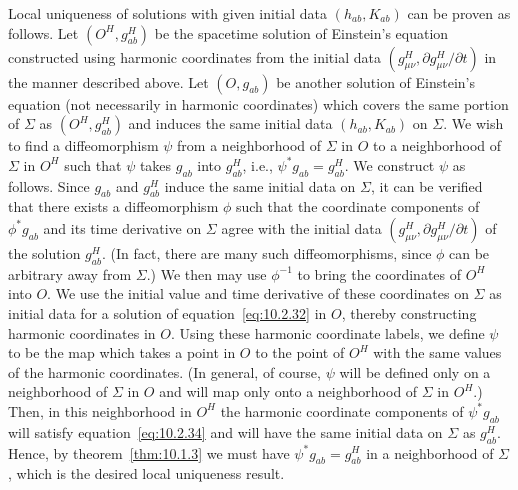 Local uniqueness of solutions with given initial data \((h_{ab},K_{ab})\) can be
proven as follows. Let \((O^H,g^H_{ab})\) be the spacetime solution of Einstein's
equation constructed using harmonic coordinates from the initial data
\((g^H_{\mu\nu},\partial g^H_{\mu\nu}/\partial t)\) in the manner described above.
Let \((O,g_{ab})\) be another solution of Einstein's equation (not necessarily in
harmonic coordinates) which covers the same portion of \(\Sigma\) as
\((O^H,g^H_{ab})\) and induces the same initial data \((h_{ab},K_{ab})\) on
\(\Sigma\). We wish to find a diffeomorphism \(\psi\) from a neighborhood of
\(\Sigma\) in \(O\) to a neighborhood of \(\Sigma\) in \(O^H\) such that \(\psi\)
takes \(g_{ab}\) into \(g^H_{ab}\), i.e., \(\psi^*g_{ab}=g^H_{ab}\). We construct
\(\psi\) as follows. Since \(g_{ab}\) and \(g^H_{ab}\) induce the same initial data
on \(\Sigma\), it can be verified that there exists a diffeomorphism \(\phi\) such that
the coordinate components of \(\phi^*g_{ab}\) and its time derivative on \(\Sigma\)
agree with the initial data \((g^H_{\mu\nu},\partial g^H_{\mu\nu}/\partial t)\) of the
solution \(g^H_{ab}\). (In fact, there are many such diffeomorphisms, since \(\phi\)
can be arbitrary away from \(\Sigma\).) We then may use \(\phi^{-1}\) to bring the
coordinates of \(O^H\) into \(O\). We use the initial value and time derivative of
these coordinates on \(\Sigma\) as initial data for a solution of
equation~\eqref{eq:10.2.32} in \(O\), thereby constructing harmonic coordinates in
\(O\). Using these harmonic coordinate labels, we define \(\psi\) to be the map which
takes a point in \(O\) to the point of \(O^H\) with the same values of the harmonic
coordinates. (In general, of course, \(\psi\) will be defined only on a neighborhood
of \(\Sigma\) in \(O\) and will map only onto a neighborhood of \(\Sigma\) in
\(O^H\).) Then, in this neighborhood in \(O^H\) the harmonic coordinate components
of \(\psi^*g_{ab}\) will satisfy equation~\eqref{eq:10.2.34} and will have the same
initial data on \(\Sigma\) as \(g^H_{ab}\). Hence, by theorem~\ref{thm:10.1.3} we
must have \(\psi^*g_{ab}=g^H_{ab}\) in a neighborhood of \(\Sigma\), which is the
desired local uniqueness result.

